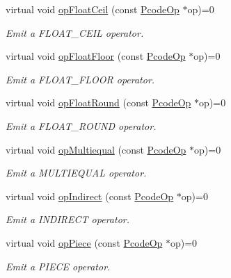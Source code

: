 \begin{DoxyCompactItemize}
virtual void \mbox{\hyperlink{class_print_language_aacc8041344fce73f799fab35c82dbbb6}{op\+Float\+Ceil}} (const \mbox{\hyperlink{class_pcode_op}{Pcode\+Op}} $\ast$op)=0
\begin{DoxyCompactList}\small\item\em Emit a F\+L\+O\+A\+T\+\_\+\+C\+E\+IL operator. \end{DoxyCompactList}\item 
virtual void \mbox{\hyperlink{class_print_language_accd41c616f41e17fc96d38144c9b5f31}{op\+Float\+Floor}} (const \mbox{\hyperlink{class_pcode_op}{Pcode\+Op}} $\ast$op)=0
\begin{DoxyCompactList}\small\item\em Emit a F\+L\+O\+A\+T\+\_\+\+F\+L\+O\+OR operator. \end{DoxyCompactList}\item 
virtual void \mbox{\hyperlink{class_print_language_a57b93ce74fa6048679c7d6e8fcbf8e92}{op\+Float\+Round}} (const \mbox{\hyperlink{class_pcode_op}{Pcode\+Op}} $\ast$op)=0
\begin{DoxyCompactList}\small\item\em Emit a F\+L\+O\+A\+T\+\_\+\+R\+O\+U\+ND operator. \end{DoxyCompactList}\item 
virtual void \mbox{\hyperlink{class_print_language_a3e2ad92e5b51a8880650fda48cc45a7e}{op\+Multiequal}} (const \mbox{\hyperlink{class_pcode_op}{Pcode\+Op}} $\ast$op)=0
\begin{DoxyCompactList}\small\item\em Emit a M\+U\+L\+T\+I\+E\+Q\+U\+AL operator. \end{DoxyCompactList}\item 
virtual void \mbox{\hyperlink{class_print_language_aeff48b36b2178b9aeccfea5c087f7a29}{op\+Indirect}} (const \mbox{\hyperlink{class_pcode_op}{Pcode\+Op}} $\ast$op)=0
\begin{DoxyCompactList}\small\item\em Emit a I\+N\+D\+I\+R\+E\+CT operator. \end{DoxyCompactList}\item 
virtual void \mbox{\hyperlink{class_print_language_ae266748e07c985f9bf39c224bb9322e0}{op\+Piece}} (const \mbox{\hyperlink{class_pcode_op}{Pcode\+Op}} $\ast$op)=0
\begin{DoxyCompactList}\small\item\em Emit a P\+I\+E\+CE operator. \end{DoxyCompactList}\item 

\end{DoxyCompactItemize}
